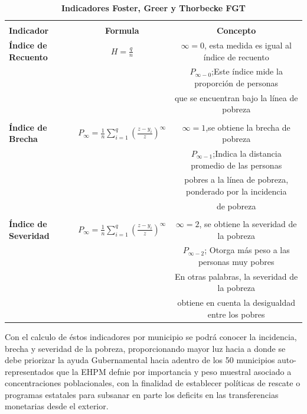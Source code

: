 \begin{table}[H]
	\centering
	\caption{\textbf{Indicadores Foster, Greer y Thorbecke FGT }}
	\label{Tabla 5} 
	\resizebox{16cm}{!} {
		\begin{tabular}{lcc} \toprule \\ 									
			\textbf{Indicador}	&	\textbf{Formula}	&	\textbf{Concepto}\\ \midrule
			\textbf{Índice de Recuento}& $H =\frac{q}{n}$&  $\infty= 0$, esta medida es igual al índice de recuento \\&& $P_{\infty-0} $;Este índice mide la proporción de personas\\&& que se encuentran bajo la línea de pobreza\\\\
			\textbf{Índice de Brecha}& $P_{\infty}=\frac1{n}\sum_{i=1}^q \left(\frac{z-y_{i}}z\right)^\infty$ &  $\infty= 1$,se obtiene la brecha de pobreza \\&& $P_{\infty-1} $;Indica la distancia promedio de las personas\\&& pobres a la línea de pobreza, ponderado por la incidencia\\&& de pobreza\\\\
			\textbf{Índice de Severidad} & $P_{\infty}=\frac1{n}\sum_{i=1}^q \left(\frac{z-y_{i}}z\right)^\infty$ &  $\infty= 2$, se obtiene la severidad de la pobreza\\&& $P_{\infty-2} $; Otorga más peso a las personas muy pobres\\&& En otras palabras, la severidad de la pobreza \\&&obtiene en cuenta la desigualdad entre los pobres
			
			\\ \bottomrule
			
		\end{tabular} 
	}
	{\scriptsize {}}
	
\end{table}

Con el calculo de éstos indicadores por municipio se podrá conocer la incidencia, brecha y severidad de la pobreza, proporcionando mayor luz hacia a donde se debe priorizar la ayuda Gubernamental hacia adentro de los 50 municipios auto-representados que la EHPM defnie por importancia y peso muestral asociado a concentraciones poblacionales, con la finalidad de establecer políticas de rescate o programas estatales para subsanar en parte los deficits en las transferencias monetarias desde el exterior.

